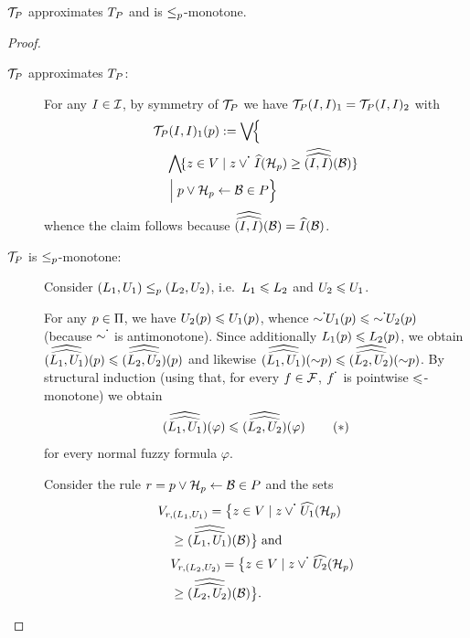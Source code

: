 \begin{proposition}
    $\mathcal{T}_{P}$ approximates $T_{P}$ and is $\leq_p$-monotone.
    \begin{proof}
        \begin{description}
            \item[\normalfont$\mathcal{T}_{P}$ approximates $T_{P}$:]
                  For any $I\in\mathcal{I}$, by symmetry of $\mathcal{T}_{P}$ we have
                  $\mathcal{T}_{P}(I,I)_1=\mathcal{T}_{P}(I,I)_2$ with
                  \begin{align*}
&\fst{\lpap(\fint, \fint)}(\atom) \eqdef \biglub \Bigl\{\\
&\quad \bigglb\{z\in\lset \mid z\flpcontf{\flpor}\fformeval{\fint}{\headminus}\geq\fnformeval{\fint}{\fint}{\body}\}\\
&\quad \Bigm| \atom \flpor \headminus\flpif{}\body \in \flp\Bigr\}
\end{align*}
                  whence the claim follows because $\widehat{\widehat{(I,I)}}\!\left(\mathcal{B}\right)=\widehat{I}\!\left(\mathcal{B}\right)$.

            \item[\normalfont$\mathcal{T}_{P}$ is $\leq_p$-monotone:]
                  Consider $(L_1,U_1)\leq_p(L_2,U_2)$, i.e.\ $L_1\leqslant L_2$ and $U_2\leqslant U_1$.

                  For any $p\in\Pi$, we have $U_2(p)\leqslant U_1(p)$, whence
                  $\flpnotf\uint_1(\atom)\lleq\flpnotf\uint_2(\atom)$ (because $\flpnotf$ is antimonotone).
                  Since additionally $L_1(p)\leqslant L_2(p)$, we obtain
                  $\widehat{\widehat{(L_1,U_1)}}\!\left(p\right)\leqslant\widehat{\widehat{(L_2,U_2)}}\!\left(p\right)$
                  and likewise $\widehat{\widehat{(L_1,U_1)}}\!\left(\mathord{\sim}p\right)\leqslant\widehat{\widehat{(L_2,U_2)}}\!\left(\mathord{\sim}p\right)$.
                  By structural induction (using that, for every $f\in\mathcal{F}$, $\flpcontf{f}$ is pointwise $\leqslant$-monotone) we obtain
                  \[
                      \widehat{\widehat{(L_1,U_1)}}\!\left(\varphi\right)\leqslant\widehat{\widehat{(L_2,U_2)}}\!\left(\varphi\right)
                      \tag{$\ast$}
                  \]
                  for every normal fuzzy formula $\varphi$.

                  Consider the rule $r = p \lor \mathcal{H}_{p}\overset{}{\gets}\mathcal{B} \in P$ and the sets
                  \begin{align*}
&\lset_{r,(\lint_1,\uint_1)} =\bigl\{z\in\lset \mid z\flpcontf{\flpor}\fformeval{\uint_1}{\headminus}\\
&\quad \geq\fnformeval{\lint_1}{\uint_1}{\body}\bigr\} \tand\\
&\quad \lset_{r,(\lint_2,\uint_2)} =\bigl\{z\in\lset \mid z\flpcontf{\flpor}\fformeval{\uint_2}{\headminus}\\
&\quad \geq\fnformeval{\lint_2}{\uint_2}{\body}\bigr\}.
\end{align*}


\end{description}
\end{proof}
\end{proposition}
